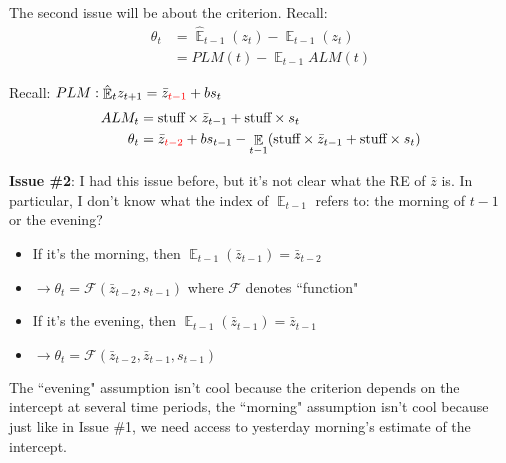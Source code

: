 \documentclass[11pt]{article}
\renewcommand{\[}{\begin{equation}}
\renewcommand{\]}{\end{equation}}
\DeclareMathOperator{\E}{\mathbb{E}}
\begin{document}
The second issue will be about the criterion. Recall:
\begin{align*}
\theta_t &=  \hat{\E}_{t-1}(z_{t}) - \E_{t-1}(z_{t})  \\
& = PLM(t) - \E_{t-1}ALM(t)
\end{align*}

 Recall: $PLM: \hat{\E}_t z_{t+1} = \bar{z}_{\color{red}{t-1}} + bs_t$
\begin{align*}
ALM_t & = \text{stuff} \times \bar{z}_{t-1} + \text{stuff} \times s_t \\
\theta_t &= \bar{z}_{\color{red}{t-2}} + bs_{t-1} - \E_{t-1}( \text{stuff} \times \bar{z}_{t-1} + \text{stuff} \times s_t)
\end{align*}

\textbf{Issue \#2}: I had this issue before, but it's not clear what the RE of $\bar{z}$ is. In particular, I don't know what the index of $\E_{t-1}$ refers to: the morning of $t-1$ or the evening?
\begin{itemize}
\item If it's the morning, then $ \E_{t-1}(\bar{z}_{t-1}) =  \bar{z}_{t-2}$
\item[] $\rightarrow \theta_t = \mathcal{F}(\bar{z}_{t-2}, s_{t-1})$ where $ \mathcal{F}$ denotes ``function"
\item If it's the evening, then $ \E_{t-1}(\bar{z}_{t-1}) =  \bar{z}_{t-1}$
\item[] $\rightarrow \theta_t =  \mathcal{F}(\bar{z}_{t-2}, \bar{z}_{t-1}, s_{t-1})$
\end{itemize}

The ``evening" assumption isn't cool because the criterion depends on the intercept at several time periods, the ``morning" assumption isn't cool because just like in Issue \#1, we need access to yesterday morning's estimate of the intercept.
\end{document}

